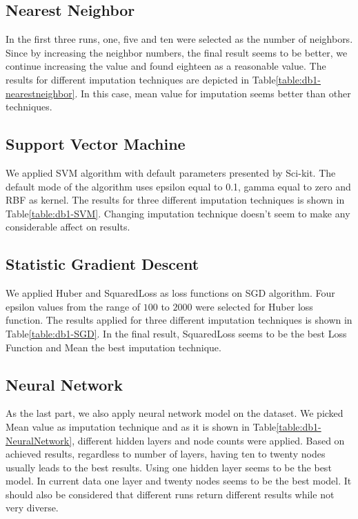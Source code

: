 \subsection{Nearest Neighbor}
In the first three runs, one, five and ten were selected as the number of neighbors. Since by increasing the neighbor numbers, the final result seems to be better, we continue increasing the value and found eighteen as a reasonable value. The results for different imputation techniques are depicted in Table\ref{table:db1-nearestneighbor}. In this case, mean value for imputation seems better than other techniques.

\subsection{Support Vector Machine}
We applied SVM algorithm with default parameters presented by Sci-kit. The default mode of the algorithm uses epsilon equal to 0.1, gamma equal to zero and RBF as kernel. The results for three different imputation techniques is shown in Table\ref{table:db1-SVM}. Changing imputation technique doesn't seem to make any considerable affect on results.

\subsection{Statistic Gradient Descent}
We applied Huber and SquaredLoss as loss functions on SGD algorithm. Four epsilon values from the range of $100$ to $2000$ were selected for Huber loss function. The results applied for three different imputation techniques is shown in Table\ref{table:db1-SGD}. In the final result, SquaredLoss seems to be the best Loss Function and Mean the best imputation technique.

\subsection{Neural Network}
As the last part, we also apply neural network model on the dataset. We picked Mean value as imputation technique and as it is shown in Table\ref{table:db1-NeuralNetwork}, different hidden layers and node counts were applied. Based on achieved results, regardless to number of layers, having ten to twenty nodes usually leads to the best results. Using one hidden layer seems to be the best model. In current data one layer and twenty nodes seems to be the best model. It should also be considered that different runs return different results while not very diverse.

